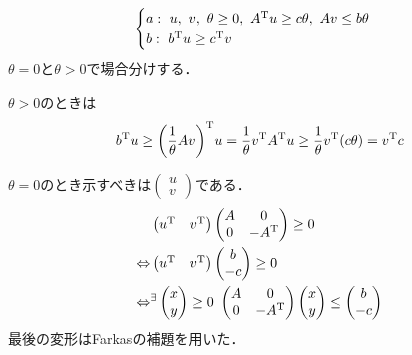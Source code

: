 \begin{equation*}
  \begin{cases}
    a:\ u,\ v,\ \theta\geq 0,\ {A}^{\mathrm{T}}u\geq c\theta ,\ Av\leq b\theta\\
    b:\ {b}^{\mathrm{T}}u\geq{c}^{\mathrm{T}}v
  \end{cases}
\end{equation*}
$\theta =0$と$\theta >0$で場合分けする．

$\theta >0$のときは
\begin{equation*}
  {b}^{\mathrm{T}}u\geq {\left( \displaystyle\frac{1}{\theta}Av\right)}^{\mathrm{T}}u=\frac{1}{\theta}{v}^{\mathrm{T}}{A}^{\mathrm{T}}u\geq\frac{1}{\theta}{v}^{\mathrm{T}}(c\theta )={v}^{\mathrm{T}}c
\end{equation*}

$\theta =0$のとき示すべきは$\begin{pmatrix}u\\v\end{pmatrix}$である．
\begin{align}
  &\begin{pmatrix}
    {u}^{\mathrm{T}}&{v}^{\mathrm{T}}
  \end{pmatrix}
  \begin{pmatrix}
    A&0\\
    0&-{A}^{\mathrm{T}}
  \end{pmatrix}\geq 0\\
  \Leftrightarrow &\begin{pmatrix}
    {u}^{\mathrm{T}}&{v}^{\mathrm{T}}
  \end{pmatrix}
  \begin{pmatrix}
    b\\
    -c
  \end{pmatrix}\geq 0\\
  \Leftrightarrow &{}^{\exists}\begin{pmatrix}
    x\\
    y
\end{pmatrix}\geq 0\
\begin{pmatrix}
  A&0\\
  0&-{A}^{\mathrm{T}}
\end{pmatrix}
\begin{pmatrix}
  x\\
  y
\end{pmatrix}\leq
\begin{pmatrix}
  b\\
  -c
\end{pmatrix}
\end{align}
最後の変形はFarkasの補題を用いた．

